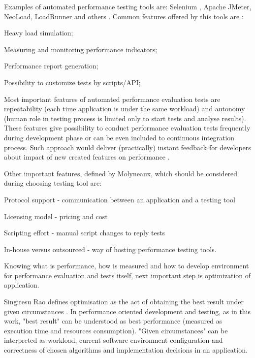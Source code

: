 \documentclass[10pt,a4paper]{article}
\let\tempone\itemize
\let\temptwo\enditemize
\renewenvironment{itemize}{\tempone\addtolength{\itemsep}{-0.4\baselineskip}}{\temptwo}
\begin{document}
Examples of automated performance testing tools are: Selenium \cite{automaiontools}, Apache JMeter, NeoLoad, LoadRunner and others \cite{analysisofpet}. Common features offered by this tools are \cite{analysisofpet}: 
\begin{itemize}
 \item Heavy load simulation;
 \item Measuring and monitoring performance indicators;
 \item Performance report generation;
 \item Possibility to customize tests by scripts/API;
\end{itemize}

Most important features of automated performance evaluation tests are repeatability (each time application is under the same workload) and autonomy (human role in testing process is limited only to start tests and analyse results). These features give possibility to conduct performance evaluation tests frequently during development phase or can be even included to continuous integration process. Such approach would deliver (practically) instant feedback for developers about impact of new created features on performance \cite{autobugs}. 

Other important features, defined by Molyneaux, which should be considered during choosing testing tool are:
\begin{itemize}
 \item Protocol support - communication between an application and a testing tool
 \item Licensing model - pricing and cost
 \item Scripting effort - manual script changes to reply tests
 \item In-house versus outsourced - way of hosting performance testing tools.
\end{itemize}

Knowing what is performance, how is measured and how to develop environment for performance evaluation and tests itself, next important step is optimization of application. 

Singiresu Rao defines optimisation as the act of obtaining the best result under given circumstances \cite{optimizationtheory}. In performance oriented development and testing, as in this work, "best result" can be understood as best performance (measured as execution time and resources consumption). "Given circumstances" can be interpreted as workload, current software environment configuration and correctness of chosen algorithms and implementation decisions in an application. 
\end{document}
